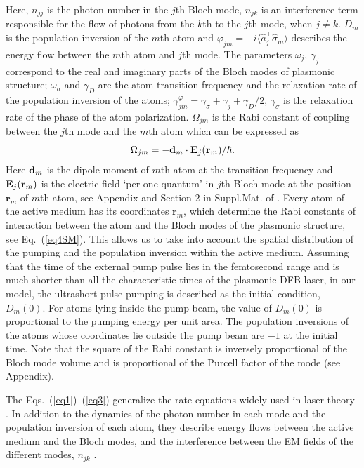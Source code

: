 \documentclass[aps,pra,amsmath,amssymb,onecolumn,superscriptaddress,showpacs,floatfix,]{revtex4-1}
\begin{document}
Here, $n_{jj}$ is the photon number in the $j$th Bloch mode, $n_{jk}$ is an interference term responsible for the flow of photons from the $k$th to the $j$th mode, when $j \neq k$.
$D_m$ is the population inversion of the $m$th atom and $\varphi _{jm} = - i \langle \hat{a} _j^{+} \hat{\sigma} _m \rangle$ describes the energy flow between the $m$th atom and $j$th mode.
The parameters $\omega _j$, $\gamma _j$ correspond to the real and imaginary parts of the Bloch modes of plasmonic structure; $\omega _{\sigma}$ and $\gamma _D$ are the atom transition frequency and the relaxation rate of the population inversion of the atoms; $\gamma _{jm}^{\varphi} = \gamma _{\sigma} + \gamma _j + \gamma _D / 2$, $\gamma _{\sigma}$ is the relaxation rate of the phase of the atom polarization.
$\Omega _{jm}$ is the Rabi constant of coupling between the $j$th mode and the $m$th atom which can be expressed as
\begin{equation}\label{eq4SM}
{\Omega _{jm}} =  - {{\bf{d}}_m} \cdot {{\bf{E}}_j}({{\bf{r}}_m})/ \hbar.
\end{equation}
Here ${{\bf{d}}_m}$ is the dipole moment of $m$th atom at the transition frequency and ${{\bf{E}}_j}({{\bf{r}}_m})$  is the electric field `per one quantum' in $j$th Bloch mode at the position $\textbf{r}_m$ of $m$th atom, see Appendix and Section 2 in Suppl.Mat. of \cite{nefedkin2018acsphot}. Every atom of the active medium has its coordinates $\textbf{r}_m$, which determine the Rabi constants of interaction between the atom and the Bloch modes of the plasmonic structure, see Eq.~(\ref{eq4SM}). This allows us to take into account the spatial distribution of the pumping and the population inversion within the active medium. Assuming that the time of the external pump pulse lies in the femtosecond range and is much shorter than all the characteristic times of the plasmonic DFB laser, in our model, the ultrashort pulse pumping is described as the initial condition, $D_m(0)$. For atoms lying inside the pump beam, the value of $D_m(0)$ is proportional to the pumping energy per unit area. The population inversions of the atoms whose coordinates lie outside the pump beam are $-1$ at the initial time. Note that the square of the Rabi constant is inversely proportional of the Bloch mode volume and is proportional of the Purcell factor of the mode (see Appendix).

The Eqs.~(\ref{eq1})--(\ref{eq3}) generalize the rate equations widely used in laser theory \cite{SiegmanLasers}.
In addition to the dynamics of the photon number in each mode and the population inversion of each atom, they describe energy flows between the active medium and the Bloch modes, and the interference between the EM fields of the different modes, $n_{jk}$ \cite{Zyablovsky2017approach}. 
\end{document}
